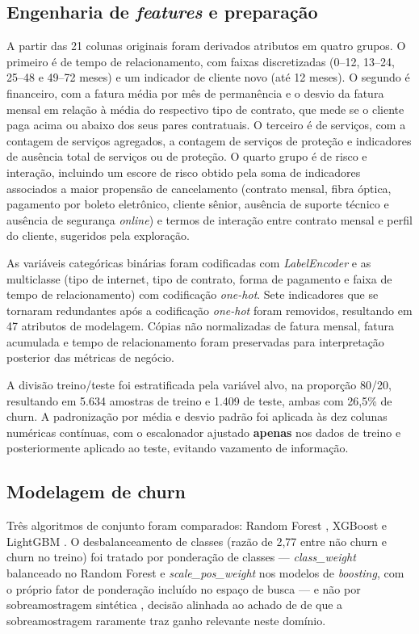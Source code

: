\documentclass[12pt]{article}
\begin{document}
\subsection{Engenharia de \textit{features} e preparação}
\label{sub:features}

A partir das 21 colunas originais foram derivados atributos em quatro grupos.
O primeiro é de tempo de relacionamento, com faixas discretizadas (0--12,
13--24, 25--48 e 49--72 meses) e um indicador de cliente novo (até 12 meses).
O segundo é financeiro, com a fatura média por mês de permanência e o desvio da
fatura mensal em relação à média do respectivo tipo de contrato, que mede se o
cliente paga acima ou abaixo dos seus pares contratuais. O terceiro é de
serviços, com a contagem de serviços agregados, a contagem de serviços de
proteção e indicadores de ausência total de serviços ou de proteção. O quarto
grupo é de risco e interação, incluindo um escore de risco obtido pela soma de
indicadores associados a maior propensão de cancelamento (contrato mensal, fibra
óptica, pagamento por boleto eletrônico, cliente sênior, ausência de suporte
técnico e ausência de segurança \textit{online}) e termos de interação entre
contrato mensal e perfil do cliente, sugeridos pela exploração.

As variáveis categóricas binárias foram codificadas com \textit{LabelEncoder} e
as multiclasse (tipo de internet, tipo de contrato, forma de pagamento e faixa
de tempo de relacionamento) com codificação \textit{one-hot}. Sete indicadores
que se tornaram redundantes após a codificação \textit{one-hot} foram removidos,
resultando em 47 atributos de modelagem. Cópias não normalizadas de fatura
mensal, fatura acumulada e tempo de relacionamento foram preservadas para
interpretação posterior das métricas de negócio.

A divisão treino/teste foi estratificada pela variável alvo, na proporção
80/20, resultando em 5.634 amostras de treino e 1.409 de teste, ambas com 26,5\%
de churn. A padronização por média e desvio padrão foi aplicada às dez colunas
numéricas contínuas, com o escalonador ajustado \textbf{apenas} nos dados de
treino e posteriormente aplicado ao teste, evitando vazamento de informação.

\subsection{Modelagem de churn}
\label{sub:modelagem}

Três algoritmos de conjunto foram comparados: Random Forest
\cite{breiman2001}, XGBoost \cite{chen2016} e LightGBM \cite{ke2017}. O
desbalanceamento de classes (razão de 2,77 entre não churn e churn no treino)
foi tratado por ponderação de classes --- \textit{class\_weight} balanceado no
Random Forest e \textit{scale\_pos\_weight} nos modelos de \textit{boosting},
com o próprio fator de ponderação incluído no espaço de busca --- e não por
sobreamostragem sintética \cite{chawla2002}, decisão alinhada ao achado de
\cite{verbeke2012} de que a sobreamostragem raramente traz ganho relevante
neste domínio.
\end{document}
